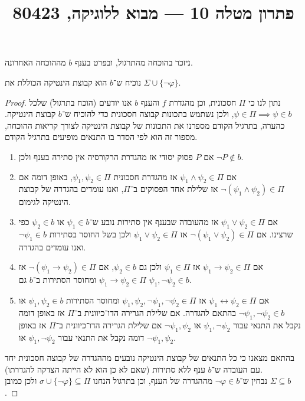 
\title{פתרון מטלה 10 --- מבוא ללוגיקה, 80423}


\maketitle
\maketitleprint{}

\question{}
ניזכר בהוכחה מהתרגול, ובפרט בענף $b$ מההוכחה האחרונה.

\subquestion{}
נוכיח ש־$b$ הוא קבוצת הינטיקה הכוללת את $\Sigma \cup \{ \lnot \varphi \}$.
\begin{proof}
	נתון לנו כי $\Pi$ חסכונית, וכן מהגדרת $f$ והענף $b$ אנו יודעים (הוכח בתרגול) שלכל $\psi \in \Pi \implies \psi \in b$, ולכן נשתמש בתכונות קבוצה חסכונית כדי להוכיח ש־$b$ קבוצת הינטיקה.
	כהערה, בתרגיל הקודם מספרנו את התכונות של קבוצת הינטיקה לצורך קריאות ההוכחה, מספור זה הוא לפי הסדר בו התנאים מופיעים בתרגיל הקודם.
	\begin{enumerate}
		\item אם $P$ פסוק יסודי אז מהגדרת הרקורסיה אין סתירה בענף ולכן $\lnot P \notin b$.
		\item אם $\psi_1 \land \psi_2 \in \Pi$ אז מהגדרת חסכונית $\psi_1, \psi_2 \in \Pi$, באופן דומה אם $\lnot (\psi_1 \land \psi_2) \in \Pi$ אז שלילת אחד הפסוקים ב־$\Pi$, ואנו עומדים בהגדרה של קבוצת הינטיקה לגימום.
		\item אם $\psi_1 \lor \psi_2 \in \Pi$ אז מהעובדה שבענף אין סתירות נובע ש־$\psi_1 \in b$ או $\psi_2 \in b$ כפי שרצינו.
			אם $\lnot (\psi_1 \lor \psi_2) \in \Pi$ אז $\psi_1 \lor \psi_2 \in \Pi$ ולכן בשל החוסר בסתירות $\lnot \psi_1 \in b$ ואנו עומדים בהגדרה.
		\item אם $\psi_1 \to \psi_2 \in \Pi$ אז $\psi_1 \in \Pi$ ולכן גם $\psi_2 \in b$, אם $\lnot (\psi_1 \to \psi_2) \in \Pi$ אז $\psi_1 \to \psi_2 \in \Pi$ ומחוסר הסתירות ב־$b$ גם $\psi_1, \lnot \psi_2 \in b$.
		\item אם $\psi_1 \leftrightarrow \psi_2 \in \Pi$ אז $\psi_1, \psi_2, \lnot \psi_1, \lnot \psi_2 \in \Pi$ ומחוסר הסתירות $\psi_1, \psi_2 \in b$ או $\lnot \psi_1, \lnot \psi_2 \in b$ בהתאם להגדרה.
			אם שלילת הגרירה הדו־כיוונית ב־$\Pi$ אז באופן דומה נקבל את התנאי עבור $\psi_1, \lnot \psi_2$ או $\lnot \psi_1, \psi_2$
			אם שלילת הגרירה הדו־כיוונית ב־$\Pi$ אז באופן דומה נקבל את התנאי עבור $\psi_1, \lnot \psi_2$ או $\lnot \psi_1, \psi_2$.
	\end{enumerate}
	בהתאם מצאנו כי כל התנאים של קבוצת הינטיקה נובעים מההגדרה של קבוצה חסכונית יחד עם העובדה ש־$b$ ענף ללא סתירות (שאם לא כן הוא לא הייתה הצדקה להגדרתו). \\
	נבחין ש־$\lnot \varphi \in b$ מההגדרה של הענף, וכן בתרגול הנחנו $\sigma \cup \{ \lnot \varphi \} \subseteq \Pi$ ולכן כמובן $\Sigma \subseteq b$.
\end{proof}


